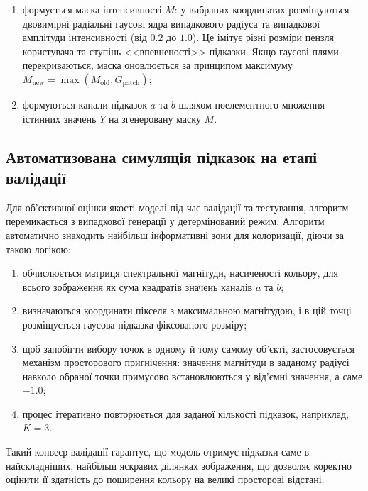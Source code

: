 \begin{enumerate}
                    Координати семплюються з цього розподілу без повернення.
                    Додатково застосовується евристика мінімальної просторової відстані, яка відкидає нові координати, якщо вони знаходяться занадто близько до вже існуючих, уникаючи неприродного скупчення кліків;
                \item формується маска інтенсивності $M$: у вибраних координатах розміщуються двовимірні радіальні гаусові ядра випадкового радіуса та випадкової амплітуди інтенсивності (від $0.2$ до $1.0$).
                    Це імітує різні розміри пензля користувача та ступінь <<впевненості>> підказки.
                    Якщо гаусові плями перекриваються, маска оновлюється за принципом максимуму $M_{\mathrm{new}} = \max(M_{\mathrm{old}}, G_{\mathrm{patch}})$;
                \item формуються канали підказок $a$ та $b$ шляхом поелементного множення істинних значень $Y$ на згенеровану маску $M$.
            \end{enumerate}

        \subsection{Автоматизована симуляція підказок на етапі валідації}
            Для об'єктивної оцінки якості моделі під час валідації та тестування, алгоритм перемикається з випадкової генерації у детермінований режим.
            Алгоритм автоматично знаходить найбільш інформативні зони для колоризації, діючи за такою логікою:
            \begin{enumerate}
                \item обчислюється матриця спектральної магнітуди, насиченості кольору, для всього зображення як сума квадратів значень каналів $a$ та $b$;
                \item визначаються координати пікселя з максимальною магнітудою, і в цій точці розміщується гаусова підказка фіксованого розміру;
                \item щоб запобігти вибору точок в одному й тому самому об'єкті, застосовується механізм просторового пригнічення: значення магнітуди в заданому радіусі навколо обраної точки примусово встановлюються у від'ємні значення, а саме $-1.0$;
                \item процес ітеративно повторюється для заданої кількості підказок, наприклад, $K=3$.
            \end{enumerate}
            Такий конвеєр валідації гарантує, що модель отримує підказки саме в найскладніших, найбільш яскравих ділянках зображення, що дозволяє коректно оцінити її здатність до поширення кольору на великі просторові відстані.

